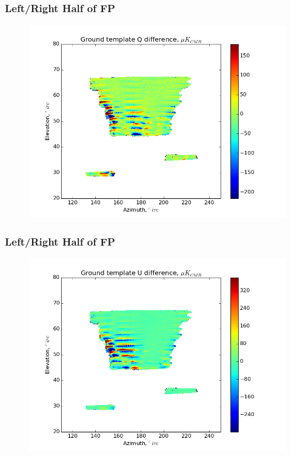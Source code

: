 \documentclass{beamer}
\begin{document}
\begin{frame}
\frametitle{Left/Right Half of FP}
\begin{figure}
\includegraphics[width=0.9\linewidth]{dQ_gt_LHS_RHS.png}
\end{figure}
\end{frame}

\begin{frame}
\frametitle{Left/Right Half of FP}
\begin{figure}
\includegraphics[width=0.9\linewidth]{dU_gt_LHS_RHS.png}
\end{figure}
\end{frame}
\end{document}
